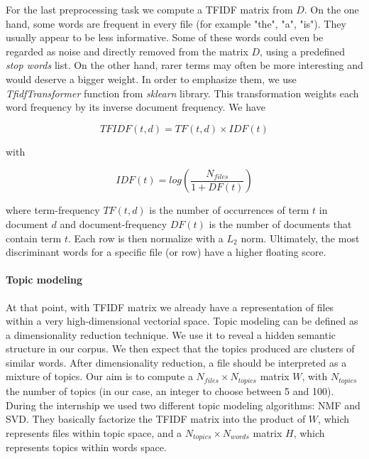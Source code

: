 \documentclass[a4paper]{article}
\begin{document}
	For the last preprocessing task we compute a \ac{TFIDF} matrix from $D$. On the one hand, some words are frequent in every file (for example "the", "a", "is"). They usually appear to be less informative. Some of these words could even be regarded as noise and directly removed from the matrix $D$, using a predefined \emph{stop words} list. On the other hand, rarer terms may often be more interesting and would deserve a bigger weight. In order to emphasize them, we use \emph{TfidfTransformer} function from \emph{sklearn} library. This transformation weights each word frequency by its inverse document frequency. We have
	
	\begin{equation}
		TFIDF(t, d) = TF(t, d) \times IDF(t)
	\end{equation}
	
	with 
	
	\begin{equation}
		IDF(t) = log(\frac{N_{files}}{1 + DF(t)})
	\end{equation}
	
	where term-frequency $TF(t, d)$ is the number of occurrences of term $t$ in document $d$ and document-frequency $DF(t)$ is the number of documents that contain term $t$. Each row is then normalize with a $L_{2}$ norm. Ultimately, the most discriminant words for a specific file (or row) have a higher floating score. 
	
	\paragraph{Topic modeling}
	
	At that point, with \ac{TFIDF} matrix we already have a representation of files within a very high-dimensional vectorial space. Topic modeling can be defined as a dimensionality reduction technique. We use it to reveal a hidden semantic structure in our corpus. We then expect that the topics produced are clusters of similar words. After dimensionality reduction, a file should be interpreted as a mixture of topics. Our aim is to compute a $N_{files} \times N_{topics}$ matrix $W$, with $N_{topics}$ the number of topics (in our case, an integer to choose between 5 and 100). During the internship we used two different topic modeling algorithms: \ac{NMF} and \ac{SVD}. They basically factorize the \ac{TFIDF} matrix into the product of $W$, which represents files within topic space, and a $N_{topics} \times N_{words}$ matrix $H$, which represents topics within words space.
	
\end{document}
